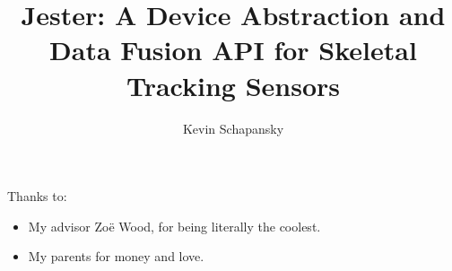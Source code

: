 \documentclass[12pt]{ucthesis}
\begin{document}

\title{Jester: 
A Device Abstraction and Data Fusion API 
for Skeletal Tracking Sensors}
\author{Kevin Schapansky}
  
 
     

\maketitle

\begin{frontmatter}

\copyrightpage

\committeemembershippage

\begin{abstract}



\end{abstract}

\begin{acknowledgements}

Thanks to:

\begin{itemize}
\item My advisor Zo{\"e} Wood, for being literally the coolest.
\item My parents for money and love.
\end{itemize}

\end{acknowledgements}

\tableofcontents

\listoftables

\listoffigures

\end{frontmatter}

\pagestyle{plain}

\renewcommand{\baselinestretch}{1.66}
\end{document}
